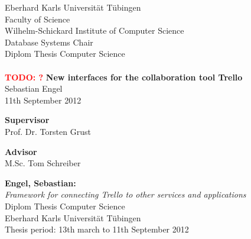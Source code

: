 \documentclass[twoside,12pt,a4paper, parskip=full-]{report}
\newcommand{\todo}[1]{\textbf{\textsc{\textcolor{red}{TODO: #1}}}}
\begin{document}

\begin{titlepage}
 \begin{center}
  {\LARGE Eberhard Karls Universit\"at T\"ubingen}\\
  {\large Faculty of Science \\
Wilhelm-Schickard Institute of Computer Science\\
Database Systems Chair\\[4cm]}
  {\huge Diplom Thesis Computer Science\\
  \\[2cm]}
  \todo{?}
  {\Large\bf  New interfaces for the collaboration tool Trello\\[1.5cm]}
 {\large Sebastian Engel}\\[0.5cm]
11th September 2012\\[4cm]

  \parbox{7cm}{\begin{center}

{\small\bf Supervisor}\\[0.5cm]
{\large Prof. Dr. Torsten Grust}\\
	\end{center}
	}\hfill\parbox{7cm}{\begin{center}
{\small\bf Advisor}\\[0.5cm]
  {\large M.Sc. Tom Schreiber}\\
	\end{center}
 }
  \end{center}
\end{titlepage}


\thispagestyle{empty}
\vspace*{\fill}
\begin{minipage}{11.2cm}
\textbf{Engel, Sebastian:}\\
\emph{Framework for connecting Trello to other services and applications}\\ Diplom Thesis Computer Science\\
Eberhard Karls Universit\"at T\"ubingen\\
Thesis period: 13th march to 11th September 2012
\end{minipage}
\newpage
\end{document}
